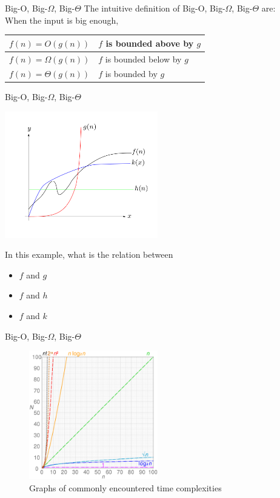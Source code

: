 \documentclass[10pt]{beamer}
\begin{document}
\begin{frame}{Big-O, Big-$\Omega$, Big-$\Theta$}
The intuitive definition of Big-O, Big-$\Omega$, Big-$\Theta$ are: \\
When the input is big enough,
\begin{table}
\centering
\begin{tabular}{|l|l|} 
\hline
$f(n) = O(g(n))$ & $f$ is bounded above by $g$  \\ 
\hline
$f(n) = \Omega(g(n))$       & $f $ is bounded below by $g$  \\ 
\hline
$f(n) = \Theta(g(n))$      & $f $ is bounded by $g$        \\
\hline
\end{tabular}
\end{table}
\centering
\end{frame}

\begin{frame}{Big-O, Big-$\Omega$, Big-$\Theta$}
\begin{centering}
\includegraphics[width = 0.5\textwidth]{img/bound.png} \\
\end{centering}
In this example, what is the relation between
\begin{itemize}
  \item $f$ and $g$
  \item $f$ and $h$
  \item $f$ and $k$
\end{itemize}
\end{frame}

\begin{frame}{Big-O, Big-$\Omega$, Big-$\Theta$}
\begin{figure}
\includegraphics[width = 0.5\textwidth]{img/complexity.png}
\caption{Graphs of commonly encountered time complexities}
\centering
\end{figure}
\end{frame}
\end{document}
